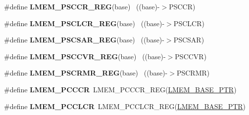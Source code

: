 \begin{DoxyCompactItemize}
\item 
\hypertarget{group___l_m_e_m___register___accessor___macros_gac981dff8530eddead08e4e16ad84a1e5}{}\#define {\bfseries L\+M\+E\+M\+\_\+\+P\+S\+C\+C\+R\+\_\+\+R\+E\+G}(base)                                      ~((base)-\/$>$P\+S\+C\+C\+R)\label{group___l_m_e_m___register___accessor___macros_gac981dff8530eddead08e4e16ad84a1e5}

\item 
\hypertarget{group___l_m_e_m___register___accessor___macros_gab0dac35985b567e72a8e7c10cf47407c}{}\#define {\bfseries L\+M\+E\+M\+\_\+\+P\+S\+C\+L\+C\+R\+\_\+\+R\+E\+G}(base)                                    ~((base)-\/$>$P\+S\+C\+L\+C\+R)\label{group___l_m_e_m___register___accessor___macros_gab0dac35985b567e72a8e7c10cf47407c}

\item 
\hypertarget{group___l_m_e_m___register___accessor___macros_ga6ce160d794b6b687bf332d5edb95ed22}{}\#define {\bfseries L\+M\+E\+M\+\_\+\+P\+S\+C\+S\+A\+R\+\_\+\+R\+E\+G}(base)                                    ~((base)-\/$>$P\+S\+C\+S\+A\+R)\label{group___l_m_e_m___register___accessor___macros_ga6ce160d794b6b687bf332d5edb95ed22}

\item 
\hypertarget{group___l_m_e_m___register___accessor___macros_ga77b3ea88ba15f2774045db6915a9c559}{}\#define {\bfseries L\+M\+E\+M\+\_\+\+P\+S\+C\+C\+V\+R\+\_\+\+R\+E\+G}(base)                                    ~((base)-\/$>$P\+S\+C\+C\+V\+R)\label{group___l_m_e_m___register___accessor___macros_ga77b3ea88ba15f2774045db6915a9c559}

\item 
\hypertarget{group___l_m_e_m___register___accessor___macros_ga8552284ea4dca8aa80bb002c9f3582bf}{}\#define {\bfseries L\+M\+E\+M\+\_\+\+P\+S\+C\+R\+M\+R\+\_\+\+R\+E\+G}(base)                                    ~((base)-\/$>$P\+S\+C\+R\+M\+R)\label{group___l_m_e_m___register___accessor___macros_ga8552284ea4dca8aa80bb002c9f3582bf}

\item 
\hypertarget{group___l_m_e_m___register___accessor___macros_gadc07b7956e11084d68e5fba9858a0fe7}{}\#define {\bfseries L\+M\+E\+M\+\_\+\+P\+C\+C\+C\+R}~L\+M\+E\+M\+\_\+\+P\+C\+C\+C\+R\+\_\+\+R\+E\+G(\hyperlink{group___l_m_e_m___peripheral_ga1666dc97b6d56a81369b43b1ee4ae240}{L\+M\+E\+M\+\_\+\+B\+A\+S\+E\+\_\+\+P\+T\+R})\label{group___l_m_e_m___register___accessor___macros_gadc07b7956e11084d68e5fba9858a0fe7}

\item 
\hypertarget{group___l_m_e_m___register___accessor___macros_ga98b0f73ffe601cc0a401a433d618c418}{}\#define {\bfseries L\+M\+E\+M\+\_\+\+P\+C\+C\+L\+C\+R}~L\+M\+E\+M\+\_\+\+P\+C\+C\+L\+C\+R\+\_\+\+R\+E\+G(\hyperlink{group___l_m_e_m___peripheral_ga1666dc97b6d56a81369b43b1ee4ae240}{L\+M\+E\+M\+\_\+\+B\+A\+S\+E\+\_\+\+P\+T\+R})\label{group___l_m_e_m___register___accessor___macros_ga98b0f73ffe601cc0a401a433d618c418}


\end{DoxyCompactItemize}
